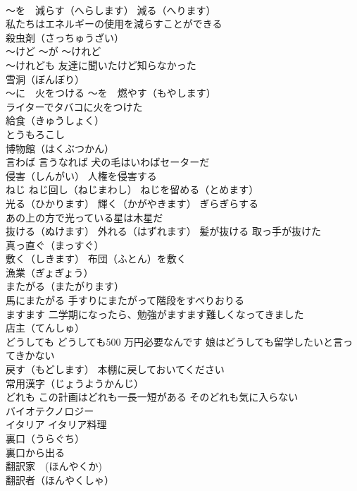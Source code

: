 \documentclass[8pt]{extreport}
\begin{document}
\begin{CJK}{UTF8}{min}
\\	～を　減らす（へらします） 減る（へります）
\\	私たちはエネルギーの使用を減らすことができる
\\	殺虫剤（さっちゅうざい）
\\	～けど ～が ～けれど 
\\	～けれども 友達に聞いたけど知らなかった
\\	雪洞（ぼんぼり）
\\	～に　火をつける ～を　燃やす（もやします）
\\	ライターでタバコに火をつけた
\\	給食（きゅうしょく）
\\	とうもろこし
\\	博物館（はくぶつかん）
\\	言わば 言うなれば 犬の毛はいわばセーターだ
\\	侵害（しんがい） 人権を侵害する
\\	ねじ ねじ回し（ねじまわし） ねじを留める（とめます）
\\	光る（ひかります） 輝く（かがやきます） ぎらぎらする 
\\	あの上の方で光っている星は木星だ
\\	抜ける（ぬけます） 外れる（はずれます） 髪が抜ける 取っ手が抜けた
\\	真っ直ぐ（まっすぐ）
\\	敷く（しきます） 布団（ふとん）を敷く
\\	漁業（ぎょぎょう）
\\	またがる（またがります） 
\\	馬にまたがる 手すりにまたがって階段をすべりおりる
\\	ますます 二学期になったら、勉強がますます難しくなってきました
\\	店主（てんしゅ）
\\	どうしても どうしても500 万円必要なんです 娘はどうしても留学したいと言ってきかない
\\	戻す（もどします） 本棚に戻しておいてください
\\	常用漢字（じょうようかんじ）
\\	どれも この計画はどれも一長一短がある そのどれも気に入らない
\\	バイオテクノロジー
\\	イタリア イタリア料理
\\	裏口（うらぐち） 
\\	裏口から出る
\\	翻訳家　(ほんやくか) 
\\	翻訳者（ほんやくしゃ）

\end{CJK}
\end{document}

